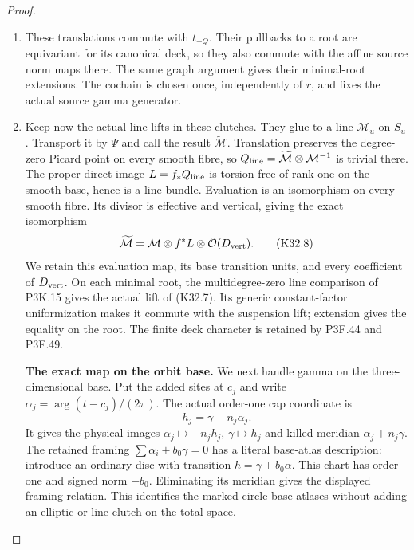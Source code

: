\begin{proof}
\begin{enumerate}[label=\arabic*.]
\item These translations commute with $t_{-Q}$. Their pullbacks
to a root are equivariant for its canonical deck, so they
also commute with the affine source norm maps there.
The same graph argument gives their minimal-root extensions.
The cochain is chosen once, independently of $r$, and fixes
the actual source gamma generator.

\item Keep now the actual line lifts in these clutches. They glue
to a line $\mathcal M_u$ on $S_u$. Transport it by $\Psi$
and call the result $\widetilde{\mathcal M}$. Translation
preserves the degree-zero Picard point on every smooth fibre,
so $Q_{\rm line}=\widetilde{\mathcal M}\otimes\mathcal M^{-1}$
is trivial there. The proper direct image
$L=f_*Q_{\rm line}$ is torsion-free of rank one on the
smooth base, hence is a line bundle. Evaluation is an
isomorphism on every smooth fibre. Its divisor is effective
and vertical, giving the exact isomorphism
\[
 \widetilde{\mathcal M}
   =\mathcal M\otimes f^*L\otimes\mathcal O(D_{\rm vert}).
                                                               \tag{K32.8}
\]
We retain this evaluation map, its base transition units,
and every coefficient of $D_{\rm vert}$. On each minimal
root, the multidegree-zero line comparison of P3K.15 gives
the actual lift of (K32.7). Its generic constant-factor
uniformization makes it commute with the suspension lift;
extension gives the equality on the root. The finite
deck character is retained by P3F.44 and P3F.49.

\par\medskip\noindent\textbf{The exact map on the orbit base.}
We next handle gamma on the three-dimensional base. Put
the added sites at $c_j$ and write
$\alpha_j=\arg(t-c_j)/(2\pi)$. The actual order-one
cap coordinate is
\[
                      h_j=\gamma-n_j\alpha_j.           \tag{K32.9}
\]
It gives the physical images $\alpha_j\mapsto-n_jh_j$,
$\gamma\mapsto h_j$ and killed meridian
$\alpha_j+n_j\gamma$.
The retained framing $\sum\alpha_i+b_0\gamma=0$ has a
literal base-atlas description: introduce an ordinary
disc with transition $h=\gamma+b_0\alpha$. This chart
has order one and signed norm $-b_0$. Eliminating its
meridian gives the displayed framing relation. This
identifies the marked circle-base atlases without adding
an elliptic or line clutch on the total space.


\end{enumerate}
\end{proof}
